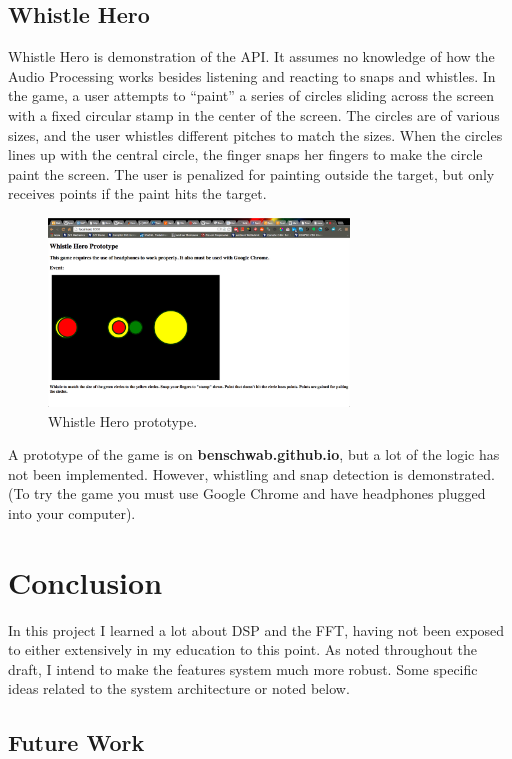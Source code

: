 \documentclass[DIV=calc, paper=a4, fontsize=11pt, twocolumn]{scrartcl}   %
\begin{document}
   \subsection{Whistle Hero}
   Whistle Hero is demonstration of the API. It assumes no knowledge of how the Audio Processing works besides listening and reacting to snaps and whistles. In the game, a user attempts to ``paint'' a series of circles sliding across the screen with a fixed circular stamp in the center of the screen. The circles are of various sizes, and the user whistles different pitches to match the sizes. When the circles lines up with the central circle, the finger snaps her fingers to make the circle paint the screen. The user is penalized for painting outside the target, but only receives points if the paint hits the target.

    \begin{figure}[h]
   \centering
   \includegraphics[width=80mm]{figures/whistleheroproto.png}
   \caption{Whistle Hero prototype.}
   \label{overflow}
   \end{figure}

   \par A prototype of the game is on \textbf{benschwab.github.io}, but a lot of the logic has not been implemented. However, whistling and snap detection is demonstrated. (To try the game you must use Google Chrome and have headphones plugged into your computer).

\section{Conclusion}
   In this project I learned a lot about DSP and the FFT, having not been exposed to either extensively in my education to this point. As noted throughout the draft, I intend to make the features system much more robust. Some specific ideas related to the system architecture or noted below.
   \subsection{Future Work}
\end{document}
